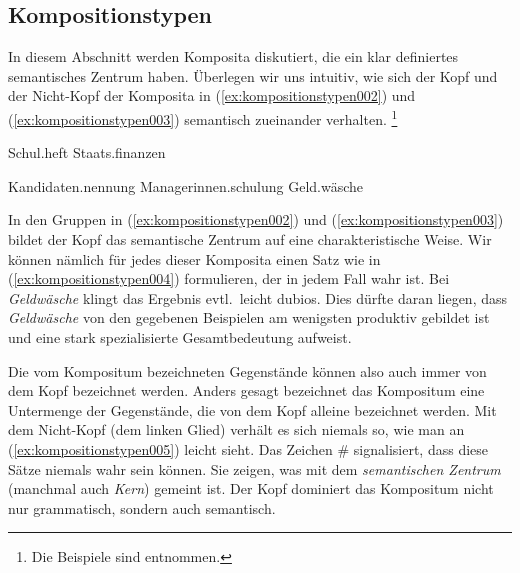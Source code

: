 \subsection{Kompositionstypen}
\label{sec:kompositionstypen}


In diesem Abschnitt werden Komposita diskutiert, die ein klar definiertes semantisches Zentrum haben.
Überlegen wir uns intuitiv, wie sich der Kopf und der Nicht-Kopf der Komposita in (\ref{ex:kompositionstypen002}) und (\ref{ex:kompositionstypen003}) semantisch zueinander verhalten.%
\footnote{Die Beispiele sind \citealp[217ff.]{Eisenberg2013a} entnommen.}

\begin{exe}
  \ex\label{ex:kompositionstypen002}
  \begin{xlist}
    \ex Schul.heft
    \ex Staats.finanzen
  \end{xlist}
  \ex\label{ex:kompositionstypen003}
  \begin{xlist}
    \ex Kandidaten.nennung
    \ex Managerinnen.schulung
    \ex Geld.wäsche
  \end{xlist}
\end{exe}

In den Gruppen in (\ref{ex:kompositionstypen002}) und (\ref{ex:kompositionstypen003}) bildet der Kopf das semantische Zentrum auf eine charakteristische Weise.
Wir können nämlich für jedes dieser Komposita einen Satz wie in (\ref{ex:kompositionstypen004}) formulieren, der in jedem Fall wahr ist.
Bei \textit{Geldwäsche} klingt das Ergebnis evtl.\ leicht dubios.
Dies dürfte daran liegen, dass \textit{Geldwäsche} von den gegebenen Beispielen am wenigsten produktiv gebildet ist und eine stark spezialisierte Gesamtbedeutung aufweist.

\begin{exe}
  \ex\label{ex:kompositionstypen004}
  \begin{xlist}
  \end{xlist}
\end{exe}

Die vom Kompositum bezeichneten Gegenstände können also auch immer von dem Kopf bezeichnet werden.
Anders gesagt bezeichnet das Kompositum eine Untermenge der Gegenstände, die von dem Kopf alleine bezeichnet werden.
Mit dem Nicht-Kopf (dem linken Glied) verhält es sich niemals so, wie man an (\ref{ex:kompositionstypen005}) leicht sieht.
Das Zeichen \# signalisiert, dass diese Sätze niemals wahr sein können.
Sie zeigen, was mit dem \textit{semantischen Zentrum} (manchmal auch \textit{Kern}) gemeint ist.
Der Kopf dominiert das Kompositum nicht nur grammatisch, sondern auch semantisch.


